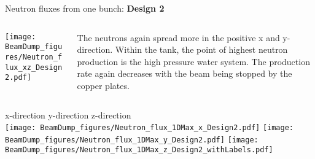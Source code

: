 \documentclass[xcolor={dvipsnames}]{beamer}
\begin{document}
\begin{frame}{Neutron fluxes from one bunch: \textbf{Design 2}}
\begin{columns}
 \begin{column}{0.5\textwidth}
    \texttt{[image: BeamDump\_figures/Neutron\_flux\_xz\_Design2.pdf]}
 \end{column}
 \begin{column}{0.5\textwidth}
  The neutrons again spread more in the positive x and y-direction. Within the tank, the point of highest neutron production is the high pressure water system. The production rate again decreases with the beam being stopped by the copper plates.
 \end{column}
\end{columns}
\hspace*{1cm} x-direction \hfill y-direction \hfill z-direction \hspace*{1cm} \\
  \texttt{[image: BeamDump\_figures/Neutron\_flux\_1DMax\_x\_Design2.pdf]}\hfill
  \texttt{[image: BeamDump\_figures/Neutron\_flux\_1DMax\_y\_Design2.pdf]}\hfill
  \texttt{[image: BeamDump\_figures/Neutron\_flux\_1DMax\_z\_Design2\_withLabels.pdf]}
\end{frame}
\end{document}
